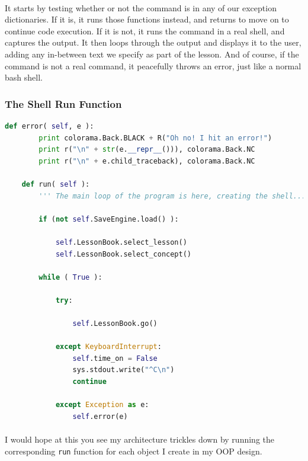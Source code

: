 \documentclass[11pt]{article}
\begin{document}
	\paragraph{} It starts by testing whether or not the command is in any of our exception dictionaries. If it is, it runs those functions instead, and returns to move on to continue code execution. If it is not, it runs the command in a real shell, and captures the output. It then loops through the output and displays it to the user, adding any in-between text we specify as part of the lesson. And of course, if the command is not a real command, it peacefully throws an error, just like a normal bash shell.

	\subsubsection{The Shell Run Function}

	\begin{lstlisting}[language=Python]
	def error( self, e ):
		print colorama.Back.BLACK + R("Oh no! I hit an error!")
		print r("\n" + str(e.__repr__())), colorama.Back.NC
		print r("\n" + e.child_traceback), colorama.Back.NC

	def run( self ):
		''' The main loop of the program is here, creating the shell...'''

		if (not self.SaveEngine.load() ):

			self.LessonBook.select_lesson()
			self.LessonBook.select_concept()

		while ( True ):

			try:
				
				self.LessonBook.go()

			except KeyboardInterrupt:
				self.time_on = False
				sys.stdout.write("^C\n")
				continue

			except Exception as e:
				self.error(e)
	\end{lstlisting}

	\paragraph{}

	\paragraph{} I would hope at this you see my architecture trickles down by running the corresponding \texttt{run} function for each object I create in my OOP design. 
\end{document}
